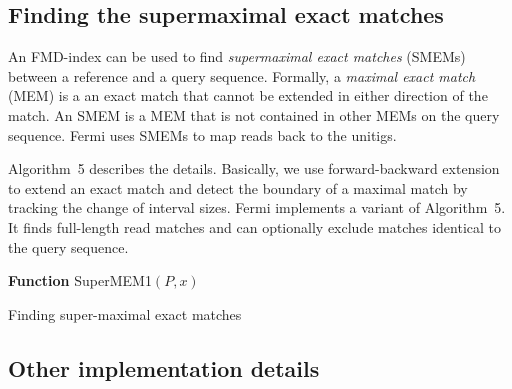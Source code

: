 \documentclass{bioinfo}
\begin{document}
\begin{methods}
\subsection{Finding the supermaximal exact matches}

An FMD-index can be used to find \emph{supermaximal exact matches} (SMEMs)
between a reference and a query sequence. Formally, a \emph{maximal exact
match} (MEM) is a an exact match that cannot be extended in either direction of
the match. An SMEM is a MEM that is not contained in other MEMs on the query
sequence. Fermi uses SMEMs to map reads back to the unitigs. 

Algorithm~5 describes the details. Basically, we use forward-backward extension
to extend an exact match and detect the boundary of a maximal match by tracking
the change of interval sizes. Fermi implements a variant of Algorithm~5. It
finds full-length read matches and can optionally exclude matches identical to
the query sequence.

\begin{algorithm}[h]
\DontPrintSemicolon
\footnotesize
{}
\BlankLine
\textbf{Function} {\sc SuperMEM1}$(P,x)$
\caption{Finding super-maximal exact matches}
\end{algorithm}

\subsection{Other implementation details}


\end{methods}
\end{document}
